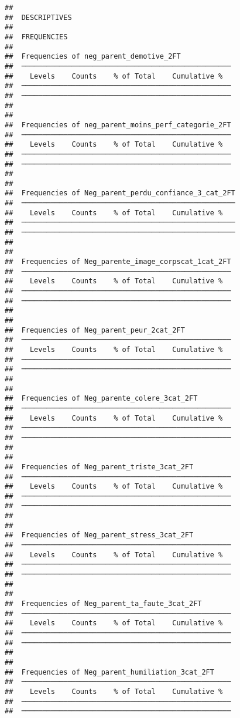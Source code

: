 \documentclass[
]{article}
\begin{document}
\begin{verbatim}
## 
##  DESCRIPTIVES
## 
##  FREQUENCIES
## 
##  Frequencies of neg_parent_demotive_2FT             
##  ────────────────────────────────────────────────── 
##    Levels    Counts    % of Total    Cumulative %   
##  ────────────────────────────────────────────────── 
##  ────────────────────────────────────────────────── 
## 
## 
##  Frequencies of neg_parent_moins_perf_categorie_2FT 
##  ────────────────────────────────────────────────── 
##    Levels    Counts    % of Total    Cumulative %   
##  ────────────────────────────────────────────────── 
##  ────────────────────────────────────────────────── 
## 
## 
##  Frequencies of Neg_parent_perdu_confiance_3_cat_2FT 
##  ─────────────────────────────────────────────────── 
##    Levels    Counts    % of Total    Cumulative %   
##  ─────────────────────────────────────────────────── 
##  ─────────────────────────────────────────────────── 
## 
## 
##  Frequencies of Neg_parente_image_corpscat_1cat_2FT 
##  ────────────────────────────────────────────────── 
##    Levels    Counts    % of Total    Cumulative %   
##  ────────────────────────────────────────────────── 
##  ────────────────────────────────────────────────── 
## 
## 
##  Frequencies of Neg_parent_peur_2cat_2FT            
##  ────────────────────────────────────────────────── 
##    Levels    Counts    % of Total    Cumulative %   
##  ────────────────────────────────────────────────── 
##  ────────────────────────────────────────────────── 
## 
## 
##  Frequencies of Neg_parente_colere_3cat_2FT         
##  ────────────────────────────────────────────────── 
##    Levels    Counts    % of Total    Cumulative %   
##  ────────────────────────────────────────────────── 
##  ────────────────────────────────────────────────── 
## 
## 
##  Frequencies of Neg_parent_triste_3cat_2FT          
##  ────────────────────────────────────────────────── 
##    Levels    Counts    % of Total    Cumulative %   
##  ────────────────────────────────────────────────── 
##  ────────────────────────────────────────────────── 
## 
## 
##  Frequencies of Neg_parent_stress_3cat_2FT          
##  ────────────────────────────────────────────────── 
##    Levels    Counts    % of Total    Cumulative %   
##  ────────────────────────────────────────────────── 
##  ────────────────────────────────────────────────── 
## 
## 
##  Frequencies of Neg_parent_ta_faute_3cat_2FT        
##  ────────────────────────────────────────────────── 
##    Levels    Counts    % of Total    Cumulative %   
##  ────────────────────────────────────────────────── 
##  ────────────────────────────────────────────────── 
## 
## 
##  Frequencies of Neg_parent_humiliation_3cat_2FT     
##  ────────────────────────────────────────────────── 
##    Levels    Counts    % of Total    Cumulative %   
##  ────────────────────────────────────────────────── 
##  ──────────────────────────────────────────────────
\end{verbatim}
\end{document}

